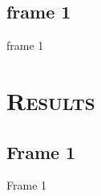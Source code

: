 \documentclass[xcolor=x11names,compress]{beamer}
\renewcommand{\(}{\begin{columns}}
\renewcommand{\)}{\end{columns}}
\newcommand{\<}[1]{\begin{column}{#1}}
\renewcommand{\>}{\end{column}}
\begin{document}
\subsection{frame 1}
\begin{frame}{frame 1}

\end{frame}

\section{\scshape Results}
\subsection{Frame 1}
\begin{frame}{Frame 1}

\end{frame}
\end{document}
